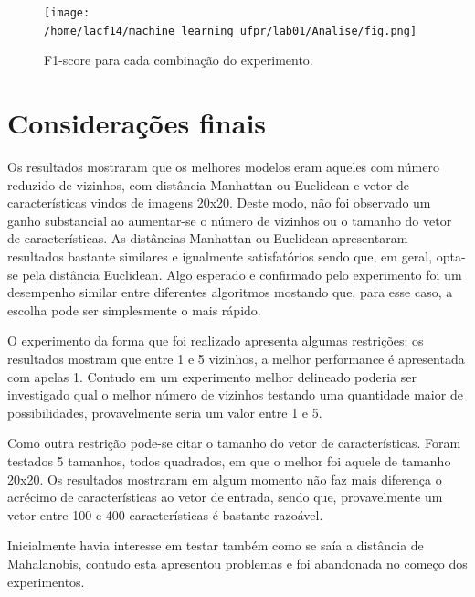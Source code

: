\documentclass[
	12pt,				%
	openright,			%
	twoside,			%
	a4paper,			%
	english,			%
	brazil,				%
	svgnames
	]{abntex2}\usepackage[]{graphicx}\usepackage[]{color}
\begin{document}
\begin{landscape}

\begin{figure}[]
\label{fig:fig1}
\centering
\texttt{[image: /home/lacf14/machine\_learning\_ufpr/lab01/Analise/fig.png]}
\caption{F1-score para cada combinação do experimento.}
\end{figure}
\end{landscape}

\chapter{Considerações finais}
\label{cap:conclusao}


Os resultados mostraram que os melhores modelos eram aqueles com número reduzido de vizinhos, com distância Manhattan ou Euclidean e vetor de características vindos de imagens 20x20. Deste modo, não foi observado um ganho substancial ao aumentar-se o número de vizinhos ou o tamanho do vetor de características. As distâncias Manhattan ou Euclidean apresentaram resultados bastante similares e igualmente satisfatórios sendo que, em geral, opta-se pela distância Euclidean. Algo esperado e confirmado pelo experimento foi um desempenho similar entre diferentes algoritmos mostando que, para esse caso, a escolha pode ser simplesmente o mais rápido.

O experimento da forma que foi realizado apresenta algumas restrições: os resultados mostram que entre 1 e 5 vizinhos, a melhor performance é apresentada com apelas 1. Contudo em um experimento melhor delineado poderia ser investigado qual o melhor número de vizinhos testando uma quantidade maior de possibilidades, provavelmente seria um valor entre 1 e 5. 

Como outra restrição pode-se citar o tamanho do vetor de características. Foram testados 5 tamanhos, todos quadrados, em que o melhor foi aquele de tamanho 20x20. Os resultados mostraram em algum momento não faz mais diferença o acrécimo de características ao vetor de entrada, sendo que, provavelmente um vetor entre 100 e 400 características é bastante razoável.

Inicialmente havia interesse em testar também como se saía a distância de Mahalanobis, contudo esta apresentou problemas e foi abandonada no começo dos experimentos. 
\end{document}
